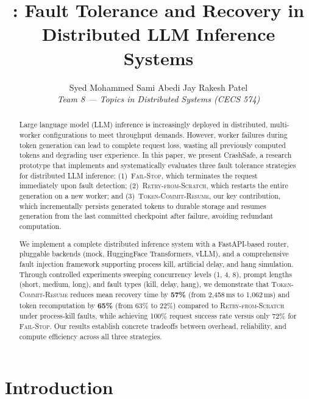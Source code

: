 \documentclass[10pt,twocolumn]{article}
\title{\textbf{\sys: Fault Tolerance and Recovery in\\Distributed LLM Inference Systems}}
\author{
  Syed Mohammed Sami Abedi \quad Jay Rakesh Patel\\
  \textit{Team 8 --- Topics in Distributed Systems (CECS 574)}
}
\date{}
\newcommand{\sys}{CrashSafe}
\newcommand{\failstop}{\textsc{Fail-Stop}}
\newcommand{\retry}{\textsc{Retry-from-Scratch}}
\newcommand{\tcr}{\textsc{Token-Commit-Resume}}
\begin{document}

\maketitle

\begin{abstract}

Large language model (LLM) inference is increasingly deployed in distributed,
multi-worker configurations to meet throughput demands. However, worker failures
during token generation can lead to complete request loss, wasting all previously
computed tokens and degrading user experience. In this paper, we present
\sys{}, a research prototype that implements and systematically evaluates three
fault tolerance strategies for distributed LLM inference: (1)~\failstop{},
which terminates the request immediately upon fault detection;
(2)~\retry{}, which restarts the entire generation on a new worker;
and (3)~\tcr{}, our key contribution, which incrementally persists generated
tokens to durable storage and resumes generation from the last committed
checkpoint after failure, avoiding redundant computation.

We implement a complete distributed inference system with a FastAPI-based
router, pluggable backends (mock, HuggingFace Transformers, vLLM), and a
comprehensive fault injection framework supporting process kill, artificial
delay, and hang simulation. Through controlled experiments sweeping concurrency
levels (1, 4, 8), prompt lengths (short, medium, long), and fault types
(kill, delay, hang), we demonstrate that \tcr{} reduces mean recovery time by
\textbf{57\%} (from 2{,}458\,ms to 1{,}062\,ms) and token recomputation by
\textbf{65\%} (from 63\% to 22\%) compared to \retry{} under process-kill
faults, while achieving 100\% request success rate versus only 72\% for
\failstop{}. Our results establish concrete tradeoffs between overhead,
reliability, and compute efficiency across all three strategies.

\end{abstract}

\section{Introduction}
\end{document}
